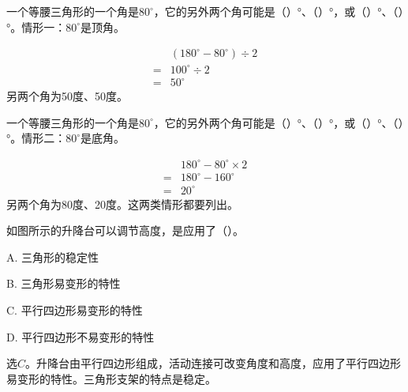 一个等腰三角形的一个角是\(80^\circ\)，它的另外两个角可能是（\hspace{1.8em}）°、（\hspace{1.8em}）°，或（\hspace{1.8em}）°、（\hspace{1.8em}）°。情形一：\(80^\circ\)是顶角。\par
\begin{BookAnswer}
\[\begin{aligned} &(180^\circ-80^\circ)\div2\\={}&100^\circ\div2\\={}&50^\circ\end{aligned}\]另两个角为50度、50度。
\end{BookAnswer}

一个等腰三角形的一个角是\(80^\circ\)，它的另外两个角可能是（\hspace{1.8em}）°、（\hspace{1.8em}）°，或（\hspace{1.8em}）°、（\hspace{1.8em}）°。情形二：\(80^\circ\)是底角。\par
\begin{BookAnswer}
\[\begin{aligned} &180^\circ-80^\circ\times2\\={}&180^\circ-160^\circ\\={}&20^\circ\end{aligned}\]另两个角为80度、20度。这两类情形都要列出。
\end{BookAnswer}

如图所示的升降台可以调节高度，是应用了（\hspace{1.8em}）。\par
\noindent A. 三角形的稳定性\par
\noindent B. 三角形易变形的特性\par
\noindent C. 平行四边形易变形的特性\par
\noindent D. 平行四边形不易变形的特性\par
{}
\begin{BookAnswer}
选\(C\)。升降台由平行四边形组成，活动连接可改变角度和高度，应用了平行四边形易变形的特性。三角形支架的特点是稳定。
\end{BookAnswer}

